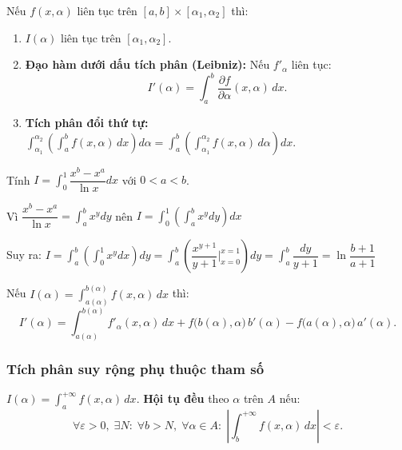 \documentclass[12pt,a4paper]{article}
\begin{document}
\begin{tinhchat}
  Nếu $f(x, \alpha)$ liên tục trên $[a,b] \times [\alpha_1, \alpha_2]$ thì:
  \begin{enumerate}
    \item $I(\alpha)$ liên tục trên $[\alpha_1, \alpha_2]$.
    \item \textbf{Đạo hàm dưới dấu tích phân (Leibniz):} Nếu $f'_\alpha$ liên tục:
      \[
        I'(\alpha) = \int_a^b \dfrac{\partial f}{\partial \alpha}(x, \alpha)\,dx.
      \]
    \item \textbf{Tích phân đổi thứ tự:}
      $\displaystyle\int_{\alpha_1}^{\alpha_2}\!\left(\int_a^b f(x,\alpha)\,dx\right)d\alpha = \int_a^b\!\left(\int_{\alpha_1}^{\alpha_2} f(x,\alpha)\,d\alpha\right)dx$.
  \end{enumerate}
\end{tinhchat}

\begin{vidu}
    Tính $I = \displaystyle \int_0^1 \dfrac{x^b-x^a}{\ln x}dx$ với $0 < a < b$.

    Vì $\dfrac{x^b-x^a}{\ln x} = \displaystyle\int_a^b x^ydy$ nên $I = \displaystyle\int_0^1(\int_a^b x^ydy)dx$

    Suy ra: $I = \displaystyle\int_a^b(\int_0^1x^ydx)dy=\int_a^b(\dfrac{x^{y+1}}{y + 1}|_{x = 0}^{x = 1})dy = \int_a^b \dfrac{dy}{y + 1} = \ln \dfrac{b + 1}{a + 1}$
\end{vidu}

\begin{congthuc}[title={Công thức Leibniz tổng quát}]
  Nếu $I(\alpha) = \displaystyle\int_{a(\alpha)}^{b(\alpha)} f(x, \alpha)\,dx$ thì:
  \[
    I'(\alpha) = \int_{a(\alpha)}^{b(\alpha)} f'_\alpha(x,\alpha)\,dx + f\bigl(b(\alpha), \alpha\bigr)\,b'(\alpha) - f\bigl(a(\alpha), \alpha\bigr)\,a'(\alpha).
  \]
\end{congthuc}

\subsubsection{Tích phân suy rộng phụ thuộc tham số}

\begin{dinhnghia}
  $I(\alpha) = \displaystyle\int_a^{+\infty} f(x, \alpha)\,dx$. \textbf{Hội tụ đều} theo $\alpha$ trên $A$ nếu:
  \[
    \forall \varepsilon > 0,\; \exists N:\; \forall b > N,\; \forall \alpha \in A:\; \left|\int_b^{+\infty} f(x,\alpha)\,dx\right| < \varepsilon.
  \]
\end{dinhnghia}
\end{document}
